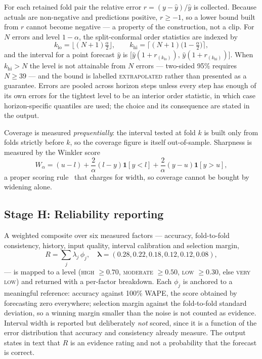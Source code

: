 \documentclass[conference]{IEEEtran}
\begin{document}
For each retained fold pair the relative error
$r=(y-\hat y)/\hat y$ is collected. Because actuals are non-negative and
predictions positive, $r\ge-1$, so a lower bound built from $r$ cannot become
negative --- a property of the construction, not a clip. For $N$ errors and
level $1-\alpha$, the split-conformal order statistics are indexed by
\begin{equation}
k_{\text{lo}}=\Big\lfloor (N{+}1)\tfrac{\alpha}{2}\Big\rfloor,\qquad
k_{\text{hi}}=\Big\lceil (N{+}1)\big(1-\tfrac{\alpha}{2}\big)\Big\rceil ,
\label{eq:conformal}
\end{equation}
and the interval for a point forecast $\hat y$ is
$\big[\hat y(1+r_{(k_{\text{lo}})}),\,\hat y(1+r_{(k_{\text{hi}})})\big]$.
When $k_{\text{hi}}>N$ the level is not attainable from $N$ errors ---
two-sided 95\% requires $N\ge39$ --- and the bound is labelled
\textsc{extrapolated} rather than presented as a guarantee. Errors are pooled
across horizon steps unless every step has enough of its own errors for the
tightest level to be an interior order statistic, in which case horizon-specific
quantiles are used; the choice and its consequence are stated in the output.

Coverage is measured \emph{prequentially}: the interval tested at fold $k$ is
built only from folds strictly before $k$, so the coverage figure is itself
out-of-sample. Sharpness is measured by the Winkler
score~\cite{winkler1972interval}
\begin{equation}
W_\alpha=(u-l)+\frac{2}{\alpha}(l-y)\mathbf{1}[y<l]+\frac{2}{\alpha}(y-u)\mathbf{1}[y>u],
\label{eq:winkler}
\end{equation}
a proper scoring rule~\cite{gneiting2007scoring} that charges for width, so
coverage cannot be bought by widening alone.

\subsection{Stage H: Reliability reporting}

A weighted composite over six measured factors --- accuracy, fold-to-fold
consistency, history, input quality, interval calibration and selection
margin,
\begin{equation}
R=\textstyle\sum_{j} \lambda_j\,\phi_j,\quad
\boldsymbol{\lambda}=(0.28,0.22,0.18,0.12,0.12,0.08),
\label{eq:reliability}
\end{equation}
--- is mapped to a level (\textsc{high} $\ge0.70$, \textsc{moderate}
$\ge0.50$, \textsc{low} $\ge0.30$, else \textsc{very low}) and returned with a
per-factor breakdown. Each $\phi_j$ is anchored to a meaningful reference:
accuracy against 100\% WAPE, the score obtained by forecasting zero
everywhere; selection margin against the fold-to-fold standard deviation, so a
winning margin smaller than the noise is not counted as evidence. Interval
width is reported but deliberately \emph{not} scored, since it is a function
of the error distribution that accuracy and consistency already measure. The
output states in text that $R$ is an evidence rating and not a probability
that the forecast is correct.
\end{document}
